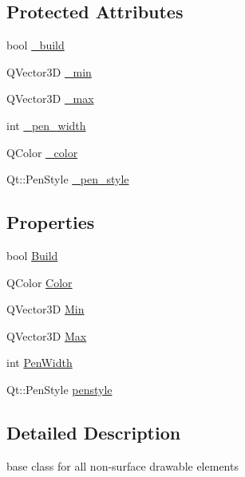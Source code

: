 \subsection*{Protected Attributes}
\begin{DoxyCompactItemize}
\item 
bool \hyperlink{classShipCAD_1_1Entity_a752e3eb309111a7457783e0fdab3d6fe}{\-\_\-build}
\item 
Q\-Vector3\-D \hyperlink{classShipCAD_1_1Entity_a414d4ff1ee308d47a5052910c3b34f7b}{\-\_\-min}
\item 
Q\-Vector3\-D \hyperlink{classShipCAD_1_1Entity_a30e4f9cb421987cebd07737a554275eb}{\-\_\-max}
\item 
int \hyperlink{classShipCAD_1_1Entity_a5a9892a0d84d2cfdcd3a5dabf662a595}{\-\_\-pen\-\_\-width}
\item 
Q\-Color \hyperlink{classShipCAD_1_1Entity_a150a19aa958886e9dcf7c4e0e51dcd98}{\-\_\-color}
\item 
Qt\-::\-Pen\-Style \hyperlink{classShipCAD_1_1Entity_ac53123be976cd9739ad1657573d67d97}{\-\_\-pen\-\_\-style}
\end{DoxyCompactItemize}
\subsection*{Properties}
\begin{DoxyCompactItemize}
\item 
bool \hyperlink{classShipCAD_1_1Entity_a7518cde7c6a7c576827efd3d65c732e4}{Build}
\item 
Q\-Color \hyperlink{classShipCAD_1_1Entity_a117b8362d17e9ef352555a85a6f015ff}{Color}
\item 
Q\-Vector3\-D \hyperlink{classShipCAD_1_1Entity_ac363c3a8e4d5553b98996d6114b6b148}{Min}
\item 
Q\-Vector3\-D \hyperlink{classShipCAD_1_1Entity_a1ce317d1da352757209465baebce15f8}{Max}
\item 
int \hyperlink{classShipCAD_1_1Entity_a95a1cc38c08e5b64a540727afb99d25a}{Pen\-Width}
\item 
Qt\-::\-Pen\-Style \hyperlink{classShipCAD_1_1Entity_a8cbcbada188edd9d39e7c5743dc43560}{penstyle}
\end{DoxyCompactItemize}


\subsection{Detailed Description}
base class for all non-\/surface drawable elements 

